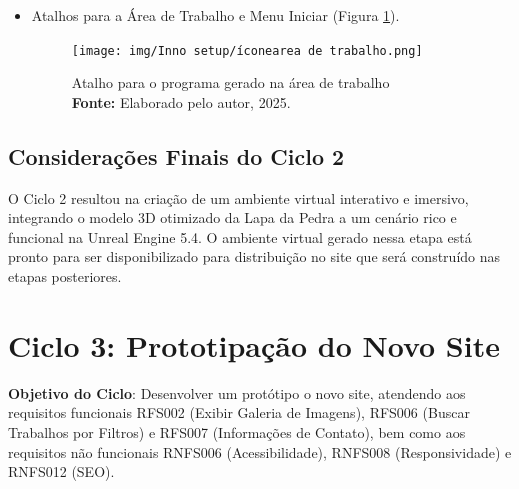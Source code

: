 \begin{itemize}
    \item Atalhos para a Área de Trabalho e Menu Iniciar (Figura \ref{fig:atalho_icone}). 
    \begin{figure}[H]
        \centering
        \texttt{[image: img/Inno setup/íconearea de trabalho.png]}
        \caption{Atalho para o programa gerado na área de trabalho \\
            \textbf{Fonte:} Elaborado pelo autor, 2025.}
        \label{fig:atalho_icone}
\end{figure}
    
\end{itemize}




\subsection*{Considerações Finais do Ciclo 2}
O Ciclo 2 resultou na criação de um ambiente virtual interativo e imersivo, integrando o modelo 3D otimizado da Lapa da Pedra a um cenário rico e funcional na Unreal Engine 5.4. O ambiente virtual gerado nessa etapa está pronto para ser disponibilizado para distribuição no site que será construído nas etapas posteriores.






\section{Ciclo 3: Prototipação do Novo Site}
\label{sec:ciclo3_site}

\textbf{Objetivo do Ciclo}: Desenvolver um protótipo o novo site, atendendo aos requisitos funcionais RFS002 (Exibir Galeria de Imagens), RFS006 (Buscar Trabalhos por Filtros) e RFS007 (Informações de Contato), bem como aos requisitos não funcionais RNFS006 (Acessibilidade), RNFS008 (Responsividade) e RNFS012 (SEO).

